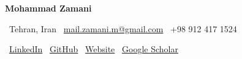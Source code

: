 \documentclass[11pt]{article}  %
\newcommand{\name}[1]{{\Huge\bfseries\color{primary} #1}\par\vspace{0.1em}}  %
\newcommand{\contact}[2]{\href{#1}{\color{primary}#2}}  %
\begin{document}

\begin{center}
    \name{Mohammad Zamani}  %
    \end{center}

\begin{center}
    \begin{minipage}{0.95\textwidth}
        \centering
        \small
        \faMapMarker\ Tehran, Iran \quad  %
        \faEnvelope\ \contact{mailto:mail.zamani.m@gmail.com}{mail.zamani.m@gmail.com} \quad  %
        \faPhone\ +98 912 417 1524  %
        \vspace{0.5em}  %
        
        \faLinkedin\ \contact{https://linkedin.com/in/mohammad-zamani-087925189}{LinkedIn} \quad  %
        \faGithub\ \contact{https://github.com/mo-zamani}{GitHub} \quad  %
        \faGlobe\ \contact{https://mo-zamani.github.io}{Website} \quad  %
        \faGraduationCap\ \contact{https://scholar.google.com/citations?user=2nRWu88AAAAJ}{Google Scholar}  %
    \end{minipage}
\end{center}

\vspace{0.1em}  %
\end{document}
